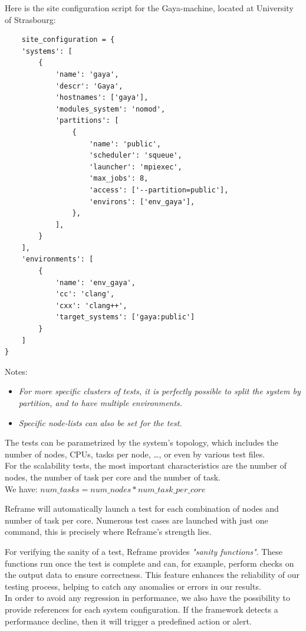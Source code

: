 \documentclass[12pt]{article}
\begin{document}
Here is the site configuration script for the Gaya-machine, located at University of Strasbourg:
\begin{scriptsize}
\begin{verbatim}
    site_configuration = {
    'systems': [
        {
            'name': 'gaya',
            'descr': 'Gaya',
            'hostnames': ['gaya'],
            'modules_system': 'nomod',
            'partitions': [
                {
                    'name': 'public',
                    'scheduler': 'squeue',
                    'launcher': 'mpiexec',
                    'max_jobs': 8,
                    'access': ['--partition=public'],
                    'environs': ['env_gaya'],
                },
            ],
        }
    ],
    'environments': [
        {
            'name': 'env_gaya',
            'cc': 'clang',
            'cxx': 'clang++',
            'target_systems': ['gaya:public']
        }
    ]
}
\end{verbatim}
\end{scriptsize}

Notes:
\begin{itemize}[left=2cm]
    \item \textit{For more specific clusters of tests, it is perfectly possible to split the system by partition, and to have multiple environments.}
    \item \textit{Specific node-lists can also be set for the test.}
\end{itemize}

The tests can be parametrized by the system's topology, which includes the number of nodes, CPUs, tasks per node, \ldots, or even by various test files. \\
For the scalability tests, the most important characteristics are the number of nodes, the number of task per core and the number of task.\\
We have: $num\_tasks = num\_nodes * num\_task\_per\_core$

Reframe will automatically launch a test for each combination of nodes and number of task per core.
Numerous test cases are launched with just one command, this is precisely where Reframe's strength lies.

For verifying the sanity of a test, Reframe provides \textit{"sanity functions"}. These functions run once the test is complete and can, for example, perform checks on the output data to ensure correctness. 
This feature enhances the reliability of our testing process, helping to catch any anomalies or errors in our results. \\
In order to avoid any regression in performance, we also have the possibility to provide references for each system configuration.
If the framework detects a performance decline, then it will trigger a predefined action or alert.
\end{document}
